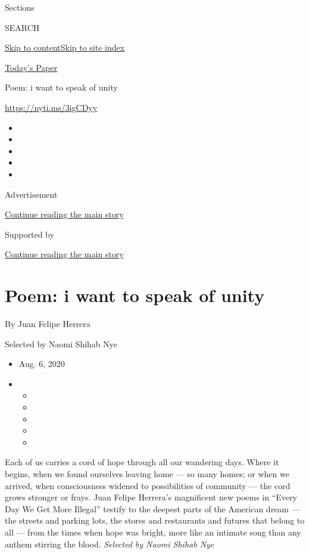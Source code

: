 Sections

SEARCH

\protect\hyperlink{site-content}{Skip to
content}\protect\hyperlink{site-index}{Skip to site index}

\href{https://myaccount.nytimes.com/auth/login?response_type=cookie\&client_id=vi}{}

\href{https://www.nytimes.com/section/todayspaper}{Today's Paper}

Poem: i want to speak of unity

\href{https://nyti.ms/3igCDyy}{https://nyti.ms/3igCDyy}

\begin{itemize}
\item
\item
\item
\item
\item
\end{itemize}

Advertisement

\protect\hyperlink{after-top}{Continue reading the main story}

Supported by

\protect\hyperlink{after-sponsor}{Continue reading the main story}

\hypertarget{poem-i-want-to-speak-of-unity}{%
\section{Poem: i want to speak of
unity}\label{poem-i-want-to-speak-of-unity}}

By Juan Felipe Herrera

Selected by Naomi Shihab Nye

\begin{itemize}
\item
  Aug. 6, 2020
\item
  \begin{itemize}
  \item
  \item
  \item
  \item
  \item
  \end{itemize}
\end{itemize}

Each of us carries a cord of hope through all our wandering days. Where
it begins, when we found ourselves leaving home --- so many homes; or
when we arrived, when consciousness widened to possibilities of
community --- the cord grows stronger or frays. Juan Felipe Herrera's
magnificent new poems in ``Every Day We Get More Illegal'' testify to
the deepest parts of the American dream --- the streets and parking
lots, the stores and restaurants and futures that belong to all --- from
the times when hope was bright, more like an intimate song than any
anthem stirring the blood. \emph{Selected by Naomi Shihab Nye}

